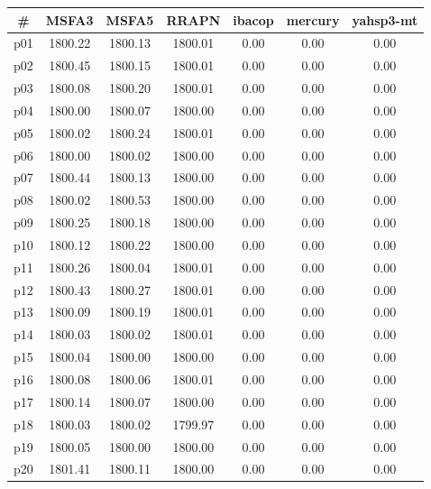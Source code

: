 \begin{tabular}{ccccccc}
\toprule
\textbf{\#} & \textbf{MSFA3} & \textbf{MSFA5} & \textbf{RRAPN} & \textbf{ibacop} & \textbf{mercury} & \textbf{yahsp3-mt}\\
\midrule
p01 & 1800.22 & 1800.13 & 1800.01 & 0.00 & 0.00 & 0.00\\
p02 & 1800.45 & 1800.15 & 1800.01 & 0.00 & 0.00 & 0.00\\
p03 & 1800.08 & 1800.20 & 1800.01 & 0.00 & 0.00 & 0.00\\
p04 & 1800.00 & 1800.07 & 1800.00 & 0.00 & 0.00 & 0.00\\
p05 & 1800.02 & 1800.24 & 1800.01 & 0.00 & 0.00 & 0.00\\
p06 & 1800.00 & 1800.02 & 1800.00 & 0.00 & 0.00 & 0.00\\
p07 & 1800.44 & 1800.13 & 1800.00 & 0.00 & 0.00 & 0.00\\
p08 & 1800.02 & 1800.53 & 1800.00 & 0.00 & 0.00 & 0.00\\
p09 & 1800.25 & 1800.18 & 1800.00 & 0.00 & 0.00 & 0.00\\
p10 & 1800.12 & 1800.22 & 1800.00 & 0.00 & 0.00 & 0.00\\
p11 & 1800.26 & 1800.04 & 1800.01 & 0.00 & 0.00 & 0.00\\
p12 & 1800.43 & 1800.27 & 1800.01 & 0.00 & 0.00 & 0.00\\
p13 & 1800.09 & 1800.19 & 1800.01 & 0.00 & 0.00 & 0.00\\
p14 & 1800.03 & 1800.02 & 1800.01 & 0.00 & 0.00 & 0.00\\
p15 & 1800.04 & 1800.00 & 1800.00 & 0.00 & 0.00 & 0.00\\
p16 & 1800.08 & 1800.06 & 1800.01 & 0.00 & 0.00 & 0.00\\
p17 & 1800.14 & 1800.07 & 1800.00 & 0.00 & 0.00 & 0.00\\
p18 & 1800.03 & 1800.02 & 1799.97 & 0.00 & 0.00 & 0.00\\
p19 & 1800.05 & 1800.00 & 1800.00 & 0.00 & 0.00 & 0.00\\
p20 & 1801.41 & 1800.11 & 1800.00 & 0.00 & 0.00 & 0.00\\
\bottomrule
\end{tabular}


